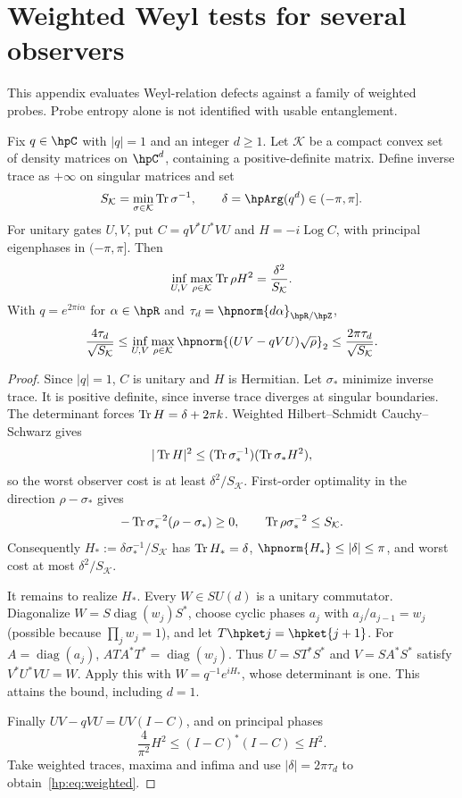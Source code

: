 \section{Weighted Weyl tests for several observers}\label{hp:app:weighted}
This appendix evaluates Weyl-relation defects against a family of weighted probes. Probe entropy alone is not identified with usable entanglement.

\begin{theorem}\label{hp:thm:weighted}
Fix $q\in\hpC$ with $|q|=1$ and an integer $d\ge1$. Let $\mathcal K$ be a compact convex set of density matrices on $\hpC^d$, containing a positive-definite matrix. Define inverse trace as $+\infty$ on singular matrices and set
\[
 S_{\mathcal K}=\min_{\sigma\in\mathcal K}\Tr\sigma^{-1},\qquad
 \delta=\hpArg(q^d)\in(-\pi,\pi].
\]
For unitary gates $U,V$, put $C=qV^*U^*VU$ and $H=-i\operatorname{Log}C$, with principal eigenphases in $(-\pi,\pi]$. Then
\[
 \inf_{U,V}\max_{\rho\in\mathcal K}\operatorname{Tr}\rho H^2
       =\frac{\delta^2}{S_{\mathcal K}}.
\]
With $q=e^{2\pi i\alpha}$ for $\alpha\in\hpR$ and $\tau_d=\hpnorm{d\alpha}_{\hpR/\hpZ}$,
\begin{equation}
 \frac{4\tau_d}{\sqrt{S_{\mathcal K}}}
 \le\inf_{U,V}\max_{\rho\in\mathcal K}\hpnorm{(UV-qVU)\sqrt\rho}_2
 \le\frac{2\pi\tau_d}{\sqrt{S_{\mathcal K}}}.\label{hp:eq:weighted}
\end{equation}
\end{theorem}
\begin{proof}
Since $|q|=1$, $C$ is unitary and $H$ is Hermitian. Let $\sigma_*$ minimize inverse trace. It is positive definite, since inverse trace diverges at singular boundaries. The determinant forces $\operatorname{Tr} H=\delta+2\pi k$. Weighted Hilbert--Schmidt Cauchy--Schwarz gives
\[
 |\operatorname{Tr} H|^2\le(\operatorname{Tr}\sigma_*^{-1})(\operatorname{Tr}\sigma_*H^2),
\]
so the worst observer cost is at least $\delta^2/S_{\mathcal K}$. First-order optimality in the direction $\rho-\sigma_*$ gives
\[
 -\operatorname{Tr}\sigma_*^{-2}(\rho-\sigma_*)\ge0,
 \qquad\operatorname{Tr}\rho\sigma_*^{-2}\le S_{\mathcal K}.
\]
Consequently $H_*:=\delta\sigma_*^{-1}/S_{\mathcal K}$ has $\operatorname{Tr} H_*=\delta$, $\hpnorm{H_*}\le|\delta|\le\pi$, and worst cost at most $\delta^2/S_{\mathcal K}$.

It remains to realize $H_*$. Every $W\in SU(d)$ is a unitary commutator. Diagonalize $W=S\operatorname{diag}(w_j)S^*$, choose cyclic phases $a_j$ with $a_j/a_{j-1}=w_j$ (possible because $\prod_jw_j=1$), and let $T\hpket j=\hpket{j+1}$. For $A=\operatorname{diag}(a_j)$, $ATA^*T^*=\operatorname{diag}(w_j)$. Thus $U=ST^*S^*$ and $V=SA^*S^*$ satisfy $V^*U^*VU=W$. Apply this with $W=q^{-1}e^{iH_*}$, whose determinant is one. This attains the bound, including $d=1$.

Finally $UV-qVU=UV(I-C)$, and on principal phases
\[
 \frac4{\pi^2}H^2\le(I-C)^*(I-C)\le H^2.
\]
Take weighted traces, maxima and infima and use $|\delta|=2\pi\tau_d$ to obtain~\eqref{hp:eq:weighted}.
\end{proof}

